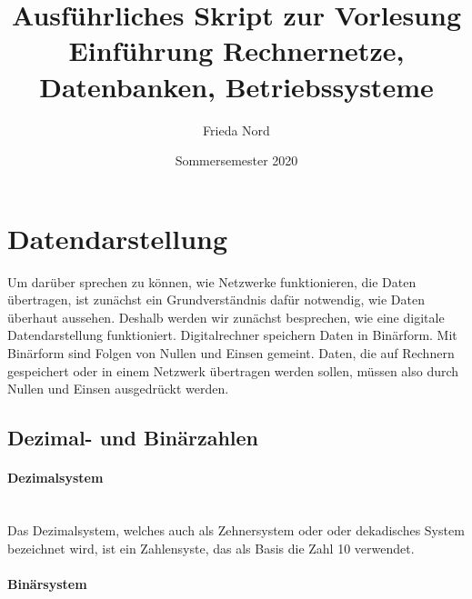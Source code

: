 \documentclass[a4paper,10pt]{article}
\title{Ausführliches Skript zur Vorlesung Einführung Rechnernetze, Datenbanken, Betriebssysteme}
\author{Frieda Nord}
\date{Sommersemester 2020}
\begin{document}
  \maketitle
  \tableofcontents

  \section{Datendarstellung}
  Um darüber sprechen zu können, wie Netzwerke funktionieren, die Daten übertragen,
  ist zunächst ein Grundverständnis dafür notwendig, wie Daten überhaut aussehen.
  Deshalb werden wir zunächst besprechen, wie eine digitale Datendarstellung
  funktioniert. Digitalrechner speichern Daten in Binärform. Mit Binärform sind
  Folgen von Nullen und Einsen gemeint. Daten, die auf Rechnern gespeichert oder
  in einem Netzwerk übertragen werden sollen, müssen also durch Nullen und Einsen
  ausgedrückt werden.

  \subsection{Dezimal- und Binärzahlen}
  \paragraph{Dezimalsystem}\mbox{}\\
  Das Dezimalsystem, welches auch als Zehnersystem oder oder dekadisches System
  bezeichnet wird, ist ein Zahlensyste, das als Basis die Zahl 10 verwendet.
  \paragraph{Binärsystem}
\end{document}
